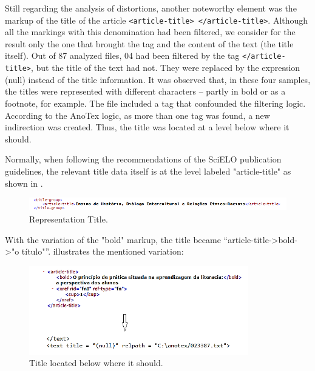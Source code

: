 \documentclass[english]{textolivre}
\begin{document}
Still regarding the analysis of distortions, another noteworthy element was the markup of the title of the article \texttt{<article-title> </article-title>}. Although all the markings with this denomination had been filtered, we consider for the result only the one that brought the tag and the content of the text (the title itself). Out of 87 analyzed files, 04 had been filtered by the tag \texttt{</article-title>}, but the title of the text had not. They were replaced by the expression (null) instead of the title information. It was observed that, in these four samples, the titles were represented with different characters – partly in bold or as a footnote, for example. The file included a tag that confounded the filtering logic. According to the AnoTex logic, as more than one tag was found, a new indirection was created. Thus, the title was located at a level below where it should.

Normally, when following the recommendations of the SciELO publication guidelines, the relevant title data itself is at the level labeled "article-title" as shown in .

\begin{figure}[htbp]
 \centering
 \includegraphics[width=\textwidth]{Fig10.png}
 \caption{Representation Title.}
 \label{fig10}
\end{figure}

With the variation of the "bold" markup, the title became “article-title->bold->"o título"”.  illustrates the mentioned variation:

\begin{figure}[htbp]
 \centering
 \includegraphics[width=0.85\textwidth]{Fig11.png}
 \caption{Title located below where it should.}
 \label{fig-11}
\end{figure}
\end{document}
